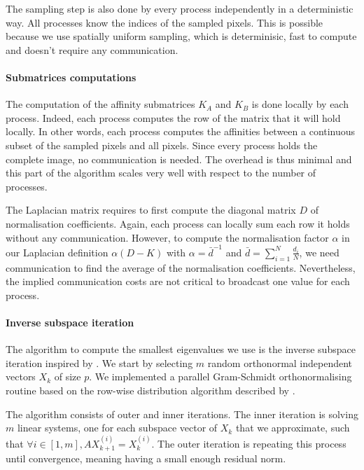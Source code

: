 The sampling step is also done by every process independently in a deterministic way.
All processes know the indices of the sampled pixels.
This is possible because we use spatially uniform sampling, which is determinisic, fast to compute and doesn't require any communication.

\paragraph{Submatrices computations}
The computation of the affinity submatrices \(K_A\) and \(K_B\) is done locally by each process.
Indeed, each process computes the row of the matrix that it will hold locally.
In other words, each process computes the affinities between a continuous subset of the sampled pixels and all pixels.
Since every process holds the complete image, no communication is needed.
The overhead is thus minimal and this part of the algorithm scales very well with respect to the number of processes.

The Laplacian matrix requires to first compute the diagonal matrix \(D\) of normalisation coefficients.
Again, each process can locally sum each row it holds without any communication.
However, to compute the normalisation factor \(\alpha\) in our Laplacian definition \(\alpha (D - K)\) with \(\alpha = \bar{d}^{-1}\) and \(\bar{d} = \sum^N_{i=1} \frac{d_i}{N}\), we need communication to find the average of the normalisation coefficients.
Nevertheless, the implied communication costs are not critical to broadcast one value for each process.

\paragraph{Inverse subspace iteration}
The algorithm to compute the smallest eigenvalues we use is the inverse subspace iteration inspired by \cite{el_khoury_acceleration_2014}.
We start by selecting \(m\) random orthonormal independent vectors \(X_k\) of size \(p\).
We implemented a parallel Gram-Schmidt orthonormalising routine based on the row-wise distribution algorithm described by \cite{katagiri_gramschmidt_2003}.


The algorithm consists of outer and inner iterations.
The inner iteration is solving \(m\) linear systems, one for each subspace vector of \(X_k\) that we approximate, such that \(\forall i \in [1, m], A X_{k+1}^{(i)} = X_k^{(i)}\).
The outer iteration is repeating this process until convergence, meaning having a small enough residual norm.


